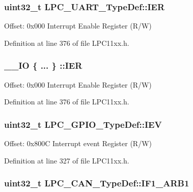 \subsubsection[{\texorpdfstring{I\+ER}{IER}}]{ uint32\+\_\+t L\+P\+C\+\_\+\+U\+A\+R\+T\+\_\+\+Type\+Def\+::\+I\+ER}\hypertarget{group___l_p_c11xx___definitions_gafc1b84e9e3670126ce7bc52a44cf0315}{}\label{group___l_p_c11xx___definitions_gafc1b84e9e3670126ce7bc52a44cf0315}
Offset\+: 0x000 Interrupt Enable Register (R/W) 

Definition at line 376 of file L\+P\+C11xx.\+h.

\subsubsection[{\texorpdfstring{I\+ER}{IER}}]{\setlength{\rightskip}{0pt plus 5cm}\+\_\+\+\_\+\+IO \{ ... \} \+::I\+ER}\hypertarget{group___l_p_c11xx___definitions_ga7aae30be6bd3688e3e8989dbb8ab85bb}{}\label{group___l_p_c11xx___definitions_ga7aae30be6bd3688e3e8989dbb8ab85bb}
Offset\+: 0x000 Interrupt Enable Register (R/W) 

Definition at line 376 of file L\+P\+C11xx.\+h.

\subsubsection[{\texorpdfstring{I\+EV}{IEV}}]{ uint32\+\_\+t L\+P\+C\+\_\+\+G\+P\+I\+O\+\_\+\+Type\+Def\+::\+I\+EV}\hypertarget{group___l_p_c11xx___definitions_ga6e9fc83dd2bca12c307e35a48963f507}{}\label{group___l_p_c11xx___definitions_ga6e9fc83dd2bca12c307e35a48963f507}
Offset\+: 0x800C Interrupt event Register (R/W) 

Definition at line 327 of file L\+P\+C11xx.\+h.

\subsubsection[{\texorpdfstring{I\+F1\+\_\+\+A\+R\+B1}{IF1_ARB1}}]{ uint32\+\_\+t L\+P\+C\+\_\+\+C\+A\+N\+\_\+\+Type\+Def\+::\+I\+F1\+\_\+\+A\+R\+B1}\hypertarget{group___l_p_c11xx___definitions_ga8bfa0cbf26f7c7b19964205260840c16}{}\label{group___l_p_c11xx___definitions_ga8bfa0cbf26f7c7b19964205260840c16}


